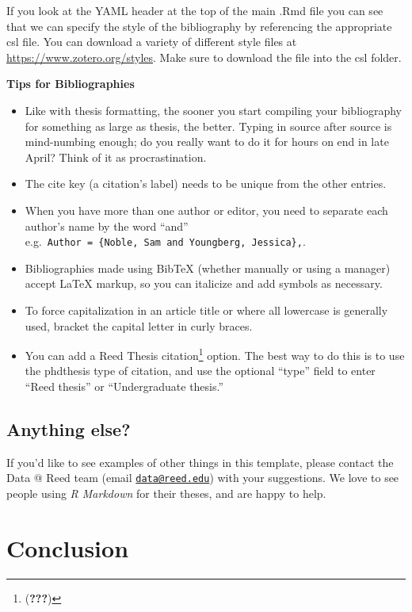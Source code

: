 \documentclass[12pt,twoside]{reedthesis}
\providecommand{\tightlist}{%
  \setlength{\itemsep}{0pt}\setlength{\parskip}{0pt}}
\begin{document}
If you look at the YAML header at the top of the main .Rmd file you can see that we can specify the style of the bibliography by referencing the appropriate csl file. You can download a variety of different style files at \url{https://www.zotero.org/styles}. Make sure to download the file into the csl folder.

\vfill

\textbf{Tips for Bibliographies}
\begin{itemize}
\tightlist
\item
  Like with thesis formatting, the sooner you start compiling your bibliography for something as large as thesis, the better. Typing in source after source is mind-numbing enough; do you really want to do it for hours on end in late April? Think of it as procrastination.
\item
  The cite key (a citation's label) needs to be unique from the other entries.
\item
  When you have more than one author or editor, you need to separate each author's name by the word ``and'' e.g.~\texttt{Author\ =\ \{Noble,\ Sam\ and\ Youngberg,\ Jessica\},}.
\item
  Bibliographies made using BibTeX (whether manually or using a manager) accept LaTeX markup, so you can italicize and add symbols as necessary.
\item
  To force capitalization in an article title or where all lowercase is generally used, bracket the capital letter in curly braces.
\item
  You can add a Reed Thesis citation\footnote{({\textbf{???}})} option. The best way to do this is to use the phdthesis type of citation, and use the optional ``type'' field to enter ``Reed thesis'' or ``Undergraduate thesis.''
\end{itemize}
\hypertarget{anything-else}{%
\section{Anything else?}\label{anything-else}}

If you'd like to see examples of other things in this template, please contact the Data @ Reed team (email \href{mailto:data@reed.edu}{\nolinkurl{data@reed.edu}}) with your suggestions. We love to see people using \emph{R Markdown} for their theses, and are happy to help.

\hypertarget{conclusion}{%
\chapter*{Conclusion}\label{conclusion}}
\end{document}
